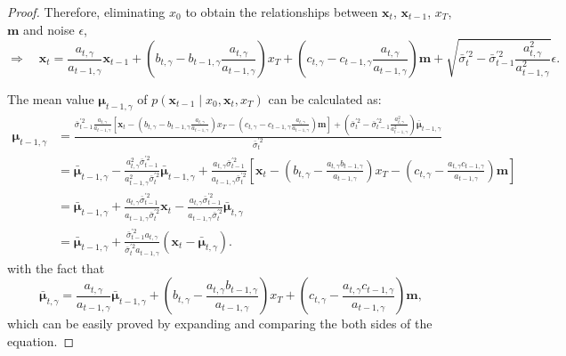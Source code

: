 \begin{proof}
Therefore, eliminating $x_0$ to obtain the relationships between $\mathbf{x}_t$, $\mathbf{x}_{t-1}$, $x_T$, $\mathbf{m}$ and noise $\epsilon$, 
\begin{equation}
\Rightarrow \quad \mathbf{x}_t = \frac{a_{t, \gamma}}{a_{t-1, \gamma}}\mathbf{x}_{t-1} + \left(b_{t, \gamma} - b_{t-1, \gamma}\frac{a_{t, \gamma}}{a_{t-1, \gamma}}\right) x_T + \left(c_{t, \gamma} - c_{t-1, \gamma}\frac{a_{t, \gamma}}{a_{t-1, \gamma}}\right) \mathbf{m} + \sqrt{\bar{\sigma}_{t}^{\prime2} - \bar{\sigma}_{t-1}^{\prime2} \frac{a^2_{t, \gamma}}{a^2_{t-1, \gamma}}} \epsilon .
\end{equation}

The mean value $\boldsymbol{\mu}_{t-1, \gamma}$ of $p(\mathbf{x}_{t-1}\mid x_0, \mathbf{x}_t, x_T)$ can be calculated as: 
\begin{equation}
\begin{aligned}
\boldsymbol{\mu}_{t-1, \gamma} &= \frac{\bar{\sigma}_{t-1}^{\prime2} \frac{a_{t, \gamma}}{a_{t-1, \gamma}} \left[\mathbf{x}_t - \left(b_{t, \gamma} - b_{t-1, \gamma}\frac{a_{t, \gamma}}{a_{t-1, \gamma}}\right) x_T - \left(c_{t, \gamma} - c_{t-1, \gamma}\frac{a_{t, \gamma}}{a_{t-1, \gamma}}\right) \mathbf{m}\right] + \left(\bar{\sigma}_{t}^{\prime2} - \bar{\sigma}_{t-1}^{\prime2} \frac{a^2_{t, \gamma}}{a^2_{t-1, \gamma}}\right) \bar{\boldsymbol{\mu}}_{t-1, \gamma}}{\bar{\sigma}_{t}^{\prime2}} \\
&= \bar{\boldsymbol{\mu}}_{t-1, \gamma} - \frac{a^2_{t, \gamma}\bar{\sigma}_{t-1}^{\prime2}}{a^2_{t-1, \gamma}\bar{\sigma}_{t}^{\prime2}} \bar{\boldsymbol{\mu}}_{t-1, \gamma} + \frac{a_{t, \gamma}\bar{\sigma}_{t-1}^{\prime2}}{a_{t-1, \gamma}\bar{\sigma}_{t}^{\prime2}} \left[ \mathbf{x}_t - \left(b_{t, \gamma} - \frac{a_{t, \gamma}b_{t-1, \gamma}}{a_{t-1, \gamma}}\right) x_T - \left(c_{t, \gamma} - \frac{a_{t, \gamma}c_{t-1, \gamma}}{a_{t-1, \gamma}}\right) \mathbf{m} \right] \\
&= \bar{\boldsymbol{\mu}}_{t-1, \gamma} + \frac{a_{t, \gamma}\bar{\sigma}_{t-1}^{\prime2}}{a_{t-1, \gamma}\bar{\sigma}_{t}^{\prime2}} \mathbf{x}_t - \frac{a_{t, \gamma}\bar{\sigma}_{t-1}^{\prime2}}{a_{t-1, \gamma}\bar{\sigma}_{t}^{\prime2}} \bar{\boldsymbol{\mu}}_{t, \gamma} \\
&= \bar{\boldsymbol{\mu}}_{t-1, \gamma} + \frac{\bar{\sigma}_{t-1}^{\prime2}a_{t, \gamma}}{\bar{\sigma}_{t}^{\prime2}a_{t-1, \gamma}} (\mathbf{x}_t - \bar{\boldsymbol{\mu}}_{t, \gamma}).
\end{aligned}
\end{equation}
with the fact that 
\begin{equation}
\bar{\boldsymbol{\mu}}_{t, \gamma} = \frac{a_{t, \gamma}}{a_{t-1, \gamma}} \bar{\boldsymbol{\mu}}_{t-1, \gamma} + \left(b_{t, \gamma} - \frac{a_{t, \gamma}b_{t-1, \gamma}}{a_{t-1, \gamma}}\right) x_T + \left(c_{t, \gamma} - \frac{a_{t, \gamma}c_{t-1, \gamma}}{a_{t-1, \gamma}}\right) \mathbf{m},
\end{equation}
which can be easily proved by expanding and comparing the both sides of the equation.


\end{proof}
